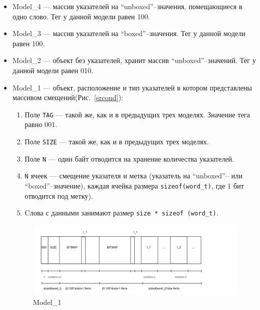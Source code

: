 \begin{itemize}
\item Model\_4 --- массив указателей на ``unboxed''--значения, помещающиеся в одно слово.
Тег у данной модели равен 100.
\item Model\_3 --- массив указателей на ``boxed''--значения.
Тег у данной модели равен 100.

\item Model\_2 --- объект без указателей, хранит массив ``unboxed''--значений.
Тег у данной модели равен 010.

\item Model\_1 --- объект, расположение и тип указателей в котором представлены массивом смещений(Рис.~\ref{srcond}):
\begin{enumerate}
\item Поле \lstinline{TAG} --- такой же, как и в предыдущих трех моделях. Значение тега равно 001.
\item Поле \lstinline{SIZE} --- такой же, как и в предыдущих трех моделях.
\item Поле \lstinline{N} --- один байт отводится на хранение количества указателей.
\item \lstinline{N} ячеек --- смещение указателя и метка (указатель на ``unboxed''-- или ``boxed''--значение), каждая ячейка размера \lstinline{sizeof(word_t)}, где 1 бит отводится под метку). 
\item Cлова с данными занимают размер \lstinline{size * sizeof (word_t)}.
\end{enumerate}

\begin{figure}[h]
\includegraphics[width=1\textwidth]{Kren/2}
\caption{Model\_1}
\label{second}
\end{figure}


\end{itemize}
